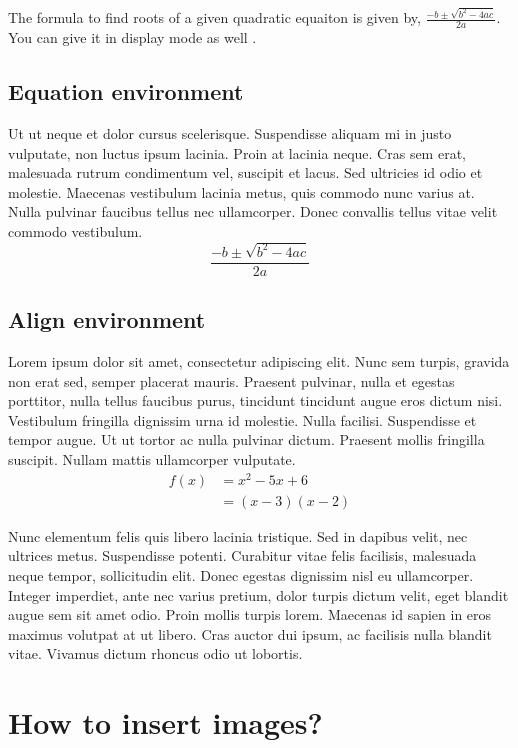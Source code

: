 \documentclass[a4paper,12pt]{article}
\begin{document}
	The formula to find roots of a given quadratic equaiton is given by, $\frac{-b\pm\sqrt{b^2-4ac}}{2a}$. You can give it in display mode as well \cite{querty_1996}.
	
\subsection{Equation environment}
	Ut ut neque et dolor cursus scelerisque. Suspendisse aliquam mi in justo vulputate, non luctus ipsum lacinia. Proin at lacinia neque. Cras sem erat, malesuada rutrum condimentum vel, suscipit et lacus. Sed ultricies id odio et molestie. Maecenas vestibulum lacinia metus, quis commodo nunc varius at. Nulla pulvinar faucibus tellus nec ullamcorper. Donec convallis tellus vitae velit commodo vestibulum.
		\begin{equation}
			\frac{-b\pm\sqrt{b^2-4ac}}{2a}
		\end{equation}
		
\subsection{Align environment}
Lorem ipsum dolor sit amet, consectetur adipiscing elit. Nunc sem turpis, gravida non erat sed, semper placerat mauris. Praesent pulvinar, nulla et egestas porttitor, nulla tellus faucibus purus, tincidunt tincidunt augue eros dictum nisi. Vestibulum fringilla dignissim urna id molestie. Nulla facilisi. Suspendisse et tempor augue. Ut ut tortor ac nulla pulvinar dictum. Praesent mollis fringilla suscipit. Nullam mattis ullamcorper vulputate.
\begin{align}
	f(x) & = x^2 -5x + 6 \\
		 & = (x-3)(x-2)
\end{align}

Nunc elementum felis quis libero lacinia tristique. Sed in dapibus velit, nec ultrices metus. Suspendisse potenti. Curabitur vitae felis facilisis, malesuada neque tempor, sollicitudin elit. Donec egestas dignissim nisl eu ullamcorper. Integer imperdiet, ante nec varius pretium, dolor turpis dictum velit, eget blandit augue sem sit amet odio. Proin mollis turpis lorem. Maecenas id sapien in eros maximus volutpat at ut libero. Cras auctor dui ipsum, ac facilisis nulla blandit vitae. Vivamus dictum rhoncus odio ut lobortis.

\section{How to insert images?}
\end{document}
